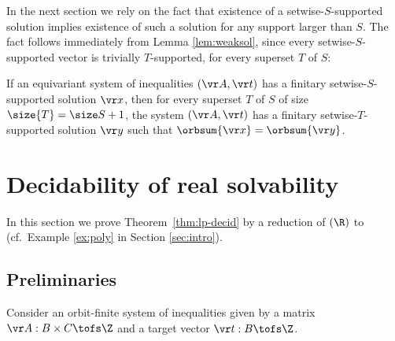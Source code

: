 In the next section we rely on the fact that
existence of a setwise-$S$-supported solution implies existence 
of such a solution for any support larger than $S$.
The fact follows immediately from
Lemma \ref{lem:weaksol}, since every setwise-$S$-supported vector is trivially $T$-supported, for
every superset $T$ of $S$:
%
\begin{corollary} \label{cor:weaksol}
If an equivariant system of inequalities $(\vr A, \vr t)$ has a finitary setwise-$S$-supported solution $\vr x$,
then  for every superset $T$ of $S$ of size $\size{T} = \size S +1$, 
the system $(\vr A, \vr t)$ has a finitary setwise-$T$-supported solution $\vr y$ 
such that $\orbsum {\vr x} = \orbsum {\vr y}$.
\end{corollary}
%




\section{Decidability of real solvability}%
\label{sec:lp-decid-proof}

In this section
we prove Theorem~\ref{thm:lp-decid} by a reduction of \finineqsolvname$(\R)$ to
\polyineqsolvname
(cf.~Example \ref{ex:poly} in Section \ref{sec:intro}).


\subsection{Preliminaries}
\label{sec:prelimproof}

Consider an orbit-finite system of inequalities given by a matrix $\vr A :  B\times C \tofs \Z$ and
a target vector $\vr t : B\tofs \Z$. 
%
%

